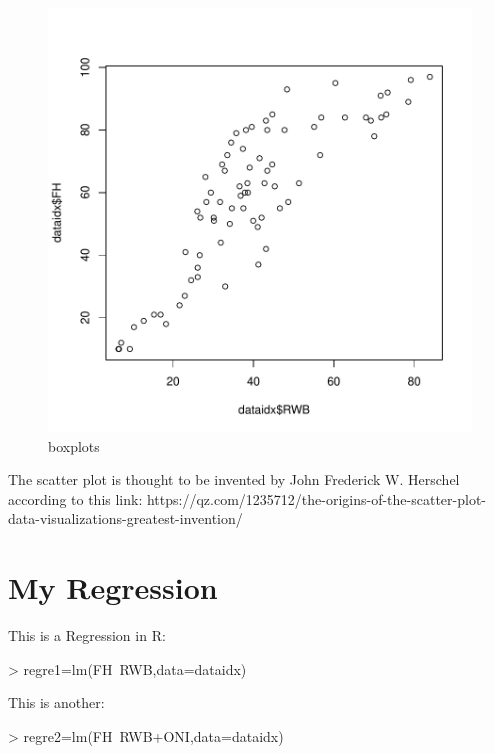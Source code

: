 \documentclass[11pt]{article}
\begin{document}
\begin{figure}[h]
\centering
\begin{adjustbox}{width=7cm,height=5.5cm,clip,trim=0cm 1cm 0cm 0cm} 
\includegraphics{PaperInR_7-numnum_plot}
\end{adjustbox}
\caption{boxplots}  %
\label{numnum_plot} %
\end{figure}


The scatter plot is thought to be invented by  John Frederick W. Herschel according to this link: https://qz.com/1235712/the-origins-of-the-scatter-plot-data-visualizations-greatest-invention/

\section{My Regression}\label{regre}

This is a Regression in R:

\begin{Schunk}
\begin{Sinput}
> regre1=lm(FH~RWB,data=dataidx)
\end{Sinput}
\end{Schunk}

This is another:

\begin{Schunk}
\begin{Sinput}
> regre2=lm(FH~RWB+ONI,data=dataidx)
\end{Sinput}
\end{Schunk}
\end{document}
